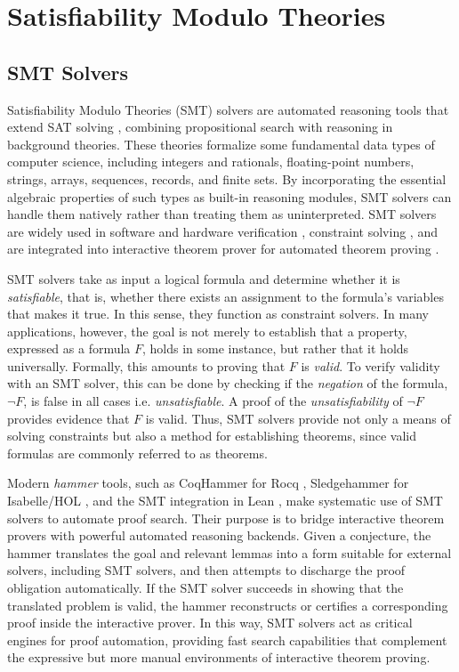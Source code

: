 \chapter{Satisfiability Modulo Theories}\label{ch:smt}


\section{SMT Solvers}

Satisfiability Modulo Theories (SMT) \cite{Barrett2021SatisfiabilityMT} solvers are automated reasoning tools that extend SAT solving \cite{chaff,minitsat}, combining propositional search with reasoning in background theories.
These theories formalize some fundamental data types of computer science, including integers and rationals, floating-point numbers, strings, arrays, sequences, records, and finite sets.
By incorporating the essential algebraic properties of such types as built-in reasoning modules, SMT solvers can handle them natively rather than treating them as uninterpreted.
SMT solvers are widely used in software and hardware verification \cite{application-smt-hardware}, constraint solving \cite{awssmt,application-smt2}, and are integrated into interactive theorem prover for automated theorem proving \cite{coqhammer1,Sledgehammer, fstar,dafny, vyper}.

SMT solvers take as input a logical formula and determine whether it is \emph{satisfiable}, that is, whether there exists an assignment to the formula's variables that makes it true.
In this sense, they function as constraint solvers.
In many applications, however, the goal is not merely to establish that a property, expressed as a formula $F$, holds in some instance, but rather that it holds universally.
Formally, this amounts to proving that $F$ is \emph{valid}. To verify validity with an SMT solver, this can be done by checking
if the \emph{negation} of the formula, $\neg F$,  is false in all cases i.e. \emph{unsatisfiable}. A proof of the \emph{unsatisfiability} of $\neg F$ provides evidence that $F$ is valid.
Thus, SMT solvers provide not only a means of solving constraints but also a method for establishing theorems, since valid formulas are commonly referred to as theorems.

Modern \emph{hammer} tools, such as CoqHammer \cite{coqhammer1} for Rocq \cite{Rocq-refman}, Sledgehammer \cite{Sledgehammer} for Isabelle/HOL \cite{isabelle-hol-ref}, and the SMT integration in Lean \cite{lean-smt}, make systematic use of SMT solvers to automate proof search.
Their purpose is to bridge interactive theorem provers with powerful automated reasoning backends.
Given a conjecture, the hammer translates the goal and relevant lemmas into a form suitable for external solvers, including SMT solvers, and then attempts to discharge the proof obligation automatically.
If the SMT solver succeeds in showing that the translated problem is valid, the hammer reconstructs or certifies a corresponding proof inside the interactive prover.
In this way, SMT solvers act as critical engines for proof automation, providing fast search capabilities that complement the expressive but more manual environments of interactive theorem proving.


